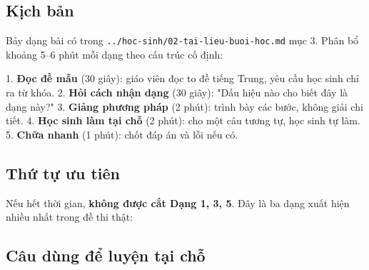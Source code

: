 \documentclass[11pt, a4paper]{article}
\begin{document}
\subsection{Kịch bản}

Bảy dạng bài có trong \texttt{../hoc-sinh/02-tai-lieu-buoi-hoc.md} mục 3. Phân bổ khoảng 5–6 phút mỗi dạng theo cấu trúc cố định:

1. \textbf{Đọc đề mẫu} (30 giây): giáo viên đọc to đề tiếng Trung, yêu cầu học sinh chỉ ra từ khóa.
2. \textbf{Hỏi cách nhận dạng} (30 giây): "Dấu hiệu nào cho biết đây là dạng này?"
3. \textbf{Giảng phương pháp} (2 phút): trình bày các bước, không giải chi tiết.
4. \textbf{Học sinh làm tại chỗ} (2 phút): cho một câu tương tự, học sinh tự làm.
5. \textbf{Chữa nhanh} (1 phút): chốt đáp án và lỗi nếu có.

\subsection{Thứ tự ưu tiên}

Nếu hết thời gian, \textbf{không được cắt Dạng 1, 3, 5}. Đây là ba dạng xuất hiện nhiều nhất trong đề thi thật:


\subsection{Câu dùng để luyện tại chỗ}
\end{document}
